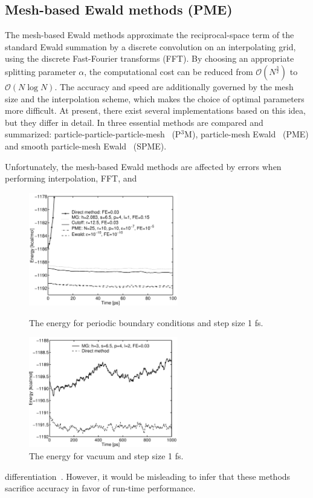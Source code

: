 \documentclass[11pt]{article}
\begin{document}
\subsection{Mesh-based Ewald methods (PME)}

The mesh-based Ewald methods approximate the reciprocal-space term of
the standard Ewald summation by a discrete convolution on an
interpolating grid, using the discrete
Fast-Fourier transforms (FFT). By choosing an appropriate
splitting parameter $\alpha$, the computational cost
can be reduced from $\mathcal{O}(N^{\frac{3}{2}})$ to $\mathcal{O}(N \log
N)$. The accuracy and speed are additionally governed by the mesh size
and the interpolation scheme, which makes the choice of optimal
parameters more difficult. At present, there exist several
implementations based on this idea, but they differ in
detail. In \cite{DeHo98} three essential methods are compared and summarized:
particle-particle-particle-mesh~\cite{HoEa81} (P$^3$M), particle-mesh
Ewald~\cite{DaYP93} (PME) and smooth particle-mesh Ewald~\cite{EsPB95}
(SPME). 

Unfortunately, the mesh-based Ewald methods are
affected by errors when performing interpolation, FFT, and
\begin{figure}[bht]
\begin{minipage}{6.6cm}
  \centerline{\includegraphics[width=6.5cm]{energydriftPBC.pdf}}
  \caption{The energy for periodic boundary conditions and step size 1 fs.\label{fig:energydriftPBC}}
\end{minipage}
\hfill
\begin{minipage}{6.6cm}
  \centerline{\includegraphics[width=6.5cm]{energydriftVacuum.pdf}}
  \caption{The energy for vacuum and step size 1 fs.\label{fig:energydriftVacuum}}
\end{minipage}
\end{figure}
differentiation~\cite{Pete95}. However, it would be misleading to
infer that these methods sacrifice accuracy in favor of run-time
performance.
\end{document}
